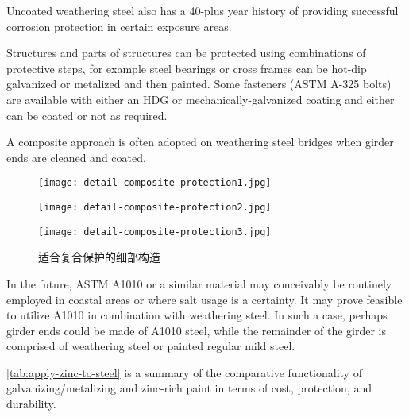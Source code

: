 Uncoated weathering steel also has a 40-plus year history of providing successful corrosion protection in certain
exposure areas.

Structures and parts of structures can be protected using combinations of protective steps, for example steel
bearings or cross frames can be hot-dip galvanized or metalized and then painted. Some fasteners (ASTM A-325
bolts) are available with either an HDG or mechanically-galvanized coating and either can be coated or not as
required.

A composite approach is often adopted on weathering steel bridges when girder ends are cleaned and coated.

\begin{figure}
  \begin{minipage}{0.55\linewidth}\centering
    \texttt{[image: detail-composite-protection1.jpg]}
  \end{minipage}%
  \begin{minipage}{0.45\linewidth}\centering
    \texttt{[image: detail-composite-protection2.jpg]}
  \end{minipage}
  \begin{minipage}{\linewidth}\centering
    \texttt{[image: detail-composite-protection3.jpg]}
  \end{minipage}%
  \caption{适合复合保护的细部构造}
  \label{fig:detail-composite-protection}
\end{figure}

In the future, ASTM A1010 or a similar material may conceivably be routinely employed in coastal areas or
where salt usage is a certainty. It may prove feasible to utilize A1010 in combination with weathering steel. In such a
case, perhaps girder ends could be made of A1010 steel, while the remainder of the girder is comprised of weathering
steel or painted regular mild steel.

\cref{tab:apply-zinc-to-steel} is a summary of the comparative functionality of galvanizing/metalizing and zinc-rich paint in terms of
cost, protection, and durability.

